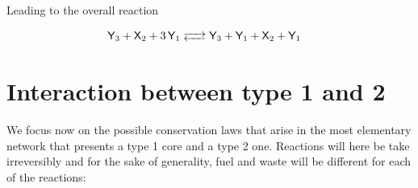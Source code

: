 \documentclass{article}
\begin{document}
Leading to the overall reaction 

\begin{equation}
		\begin{split}
  \ce{\textsf{Y}_3 + \textsf{X}_2 + 3\textsf{Y}_1 & <-->\textsf{Y}_3 + \textsf{Y}_1 + \textsf{X}_2 + \textsf{Y}_1 }
		\end{split} 
\end{equation}

\begin{comment}
\begin{figure}[h!]
\centering

\begin{tikzpicture}[>=stealth, thick]
    \node (X1) at (0, 6) {X1};
    \node (X2) at (0, 3) {X2};
    \node (Y1) at (-2.5, 4) {Y1};
    \node (Y3) at (-2.5, 1.5) {Y3};
    \node (Y2) at (0, 0) {Y2};



   \draw[->, draw=blue] (Y2) to[out=70,in=290] (X2);
    \draw[->, draw=red] (Y2) -- (Y3);
        \draw[->, draw=red] (Y3) -- (X2);

    


    \draw[->, draw=blue] (C) to[out=125,in=355] (B);
    \draw[->, draw=red] (C) to[out=180,in=320] (B);

    


    \draw[->, draw=blue] (B) -- (W);


    \draw[->, draw=red] (B) to[out=135, in=225, loop, distance=2.25cm] node [left] {3} (B);
    \draw[->, draw=blue] (B) to[out=135, in=225, loop, distance=3.5cm] node [left] {3} (B);

\end{tikzpicture}
\caption{Conservation laws for the two moieties. Both of them contains the autocatalytic process of production of $\mathsf{Y}_1$. No external "driving" process is present.}
\end{figure}

\end{comment}

\section{Interaction between type 1 and 2}%
We focus now on the possible conservation laws that arise in the most elementary network that presents a type 1 core and a type 2 one. Reactions will here be take irreversibly and for the sake of generality, fuel and waste will be different for each of the reactions:
\end{document}
